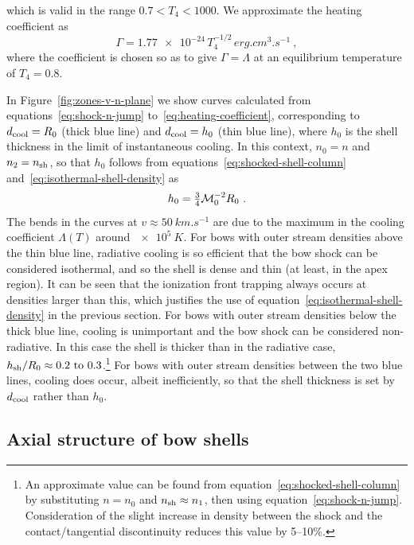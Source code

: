 which is valid in the range \(0.7 < T_4 < 1000\).  We approximate the heating coefficient as
\begin{equation}
  \label{eq:heating-coefficient}
  \Gamma = \num{1.77e-24} \, T_4^{-1/2} \, \si{erg.cm^{3}.s^{-1}} \ ,
\end{equation}
where the coefficient is chosen so as to give \(\Gamma = \Lambda\) at
an equilibrium temperature of \(T_4 = 0.8\).

In Figure~\ref{fig:zones-v-n-plane} we show curves calculated from
equations~\eqref{eq:shock-n-jump} to~\eqref{eq:heating-coefficient},
corresponding to \(d_{\text{cool}} = R_0\) (thick blue line) and
\(d_{\text{cool}} = h_0\) (thin blue line), where \(h_0\) is the shell
thickness in the limit of instantaneous cooling.  In this context,
\(n_0 = n\) and \(n_2 = n_{\text{sh}}\), so that \(h_0\) follows from
equations~\eqref{eq:shocked-shell-column}
and~\eqref{eq:isothermal-shell-density} as
\begin{equation}
  \label{eq:strong-cooling-h0}
  h_0 = \tfrac34 \mathcal{M}_0^{-2} R_0 \ .
\end{equation}
The bends in the curves at \(v \approx \SI{50}{km.s^{-1}}\) are due to the
maximum in the cooling coefficient \(\Lambda(T)\) around
\(\SI{e5}{K}\).  For bows with outer stream densities above the thin
blue line, radiative cooling is so efficient that the bow shock can be
considered isothermal, and so the shell is dense and thin (at least,
in the apex region).  It can be seen that the ionization front
trapping always occurs at densities larger than this, which justifies
the use of equation~\eqref{eq:isothermal-shell-density} in the
previous section.  For bows with outer stream densities below the
thick blue line, cooling is unimportant and the bow shock can be
considered non-radiative.  In this case the shell is thicker than in
the radiative case,
\(h\shell/R_0 \approx \text{\numrange{0.2}{0.3}}\).\footnote{%
  An approximate value can be found from
  equation~\eqref{eq:shocked-shell-column} by substituting \(n = n_0\)
  and \(n_{\text{sh}} \approx n_1\), then using equation~\eqref{eq:shock-n-jump}.
  Consideration of the slight increase in density between the shock
  and the contact/tangential discontinuity reduces this value by 5--10\%.} %
For bows with outer stream densities between the two blue lines,
cooling does occur, albeit inefficiently, so that the shell thickness
is set by \(d_{\text{cool}}\) rather than \(h_0\).

\subsection{Axial structure of bow shells}
\label{sec:axial-structure-bow}

